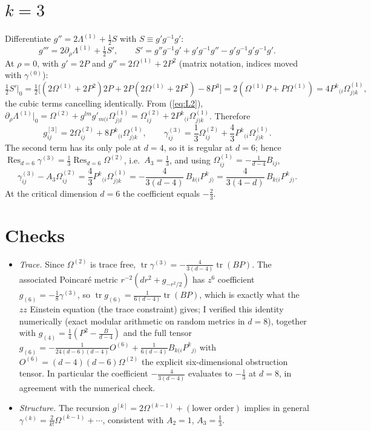 \documentclass[11pt]{article}
\newcommand{\tr}{\operatorname{tr}}
\newcommand{\Res}{\operatorname{Res}}
\begin{document}
\section{$k=3$}
Differentiate $g''=2\Lambda^{(1)}+\frac12S$ with $S\equiv g'g^{-1}g'$:
\begin{equation}
g'''=2\partial_\rho\Lambda^{(1)}+\tfrac12S',\qquad S'=g''g^{-1}g'+g'g^{-1}g''-g'g^{-1}g'g^{-1}g' .
\end{equation}
At $\rho=0$, with $g'=2P$ and $g''=2\Omega^{(1)}+2P^2$ (matrix notation, indices moved with $\gamma^{(0)}$):
\begin{equation}
\tfrac12S'\big|_0=\tfrac12\big[(2\Omega^{(1)}+2P^2)2P+2P(2\Omega^{(1)}+2P^2)-8P^3\big]=2(\Omega^{(1)}P+P\Omega^{(1)})=4P^k{}_{(i}\Omega^{(1)}_{j)k},
\end{equation}
the cubic terms cancelling identically. From (\ref{eq:L2}), $\partial_\rho\Lambda^{(1)}|_0=\Omega^{(2)}+g^{lm}g'_{m(i}\Omega^{(1)}_{j)l}=\Omega^{(2)}_{ij}+2P^k{}_{(i}\Omega^{(1)}_{j)k}$. Therefore
\begin{equation}
g^{[3]}_{ij}=2\Omega^{(2)}_{ij}+8P^k{}_{(i}\Omega^{(1)}_{j)k},\qquad
\gamma^{(3)}_{ij}=\frac{1}{3}\Omega^{(2)}_{ij}+\frac{4}{3}P^k{}_{(i}\Omega^{(1)}_{j)k}.
\end{equation}
The second term has its only pole at $d=4$, so it is regular at $d=6$; hence $\Res_{d=6}\gamma^{(3)}=\frac13\Res_{d=6}\Omega^{(2)}$, i.e.\ $A_3=\frac13$, and using $\Omega^{(1)}_{ij}=-\frac{1}{d-4}B_{ij}$,
\begin{equation}
\gamma^{(3)}_{ij}-A_3\Omega^{(2)}_{ij}=\frac{4}{3}P^k{}_{(i}\Omega^{(1)}_{j)k}=-\frac{4}{3(d-4)}\,B_{k(i}P^k{}_{j)}=\frac{4}{3(4-d)}\,B_{k(i}P^k{}_{j)} .
\end{equation}
At the critical dimension $d=6$ the coefficient equals $-\frac23$.

\section{Checks}
\begin{itemize}
\item \emph{Trace.} Since $\Omega^{(2)}$ is trace free, $\tr\gamma^{(3)}=-\frac{4}{3(d-4)}\tr(BP)$. The associated Poincar\'e metric $r^{-2}(dr^2+g_{-r^2/2})$ has $z^6$ coefficient $g_{(6)}=-\frac18\gamma^{(3)}$, so $\tr g_{(6)}=\frac{1}{6(d-4)}\tr(BP)$, which is exactly what the $zz$ Einstein equation (the trace constraint) gives; I verified this identity numerically (exact modular arithmetic on random metrics in $d=8$), together with $g_{(4)}=\frac14(P^2-\frac{B}{d-4})$ and the full tensor $g_{(6)}=-\frac{1}{24(d-6)(d-4)}O^{(6)}+\frac{1}{6(d-4)}B_{k(i}P^k{}_{j)}$ with $O^{(6)}=(d-4)(d-6)\Omega^{(2)}$ the explicit six-dimensional obstruction tensor. In particular the coefficient $-\frac{4}{3(d-4)}$ evaluates to $-\frac13$ at $d=8$, in agreement with the numerical check.
\item \emph{Structure.} The recursion $g^{[k]}=2\Omega^{(k-1)}+(\text{lower order})$ implies in general $\gamma^{(k)}=\frac{2}{k!}\Omega^{(k-1)}+\cdots$, consistent with $A_2=1$, $A_3=\frac13$.
\end{itemize}
\end{document}
